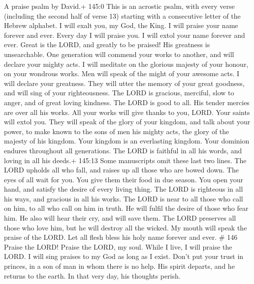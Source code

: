 A praise psalm by David.+ 145:0 This is an acrostic psalm, with every
verse (including the second half of verse 13) starting with a
consecutive letter of the Hebrew alphabet.  I will exalt
you, my God, the King. I will praise your name forever and ever.
 Every day I will praise you. I will extol your name forever
and ever.  Great is the LORD, and greatly to be praised! His
greatness is unsearchable.  One generation will commend your
works to another, and will declare your mighty acts.  I will
meditate on the glorious majesty of your honour, on your wondrous works.
 Men will speak of the might of your awesome acts. I will
declare your greatness.  They will utter the memory of your
great goodness, and will sing of your righteousness.  The
LORD is gracious, merciful, slow to anger, and of great loving kindness.
 The LORD is good to all. His tender mercies are over all
his works.  All your works will give thanks to you, LORD.
Your saints will extol you.  They will speak of the glory
of your kingdom, and talk about your power,  to make known
to the sons of men his mighty acts, the glory of the majesty of his
kingdom.  Your kingdom is an everlasting kingdom. Your
dominion endures throughout all generations. The LORD is faithful in all
his words, and loving in all his deeds.+ 145:13 Some manuscripts omit
these last two lines.  The LORD upholds all who fall, and
raises up all those who are bowed down.  The eyes of all
wait for you. You give them their food in due season.  You
open your hand, and satisfy the desire of every living thing.
 The LORD is righteous in all his ways, and gracious in all
his works.  The LORD is near to all those who call on him,
to all who call on him in truth.  He will fulfil the desire
of those who fear him. He also will hear their cry, and will save them.
 The LORD preserves all those who love him, but he will
destroy all the wicked.  My mouth will speak the praise of
the LORD. Let all flesh bless his holy name forever and ever. \# 146
 Praise the LORD! Praise the LORD, my soul. 
While I live, I will praise the LORD. I will sing praises to my God as
long as I exist.  Don't put your trust in princes, in a son
of man in whom there is no help.  His spirit departs, and he
returns to the earth. In that very day, his thoughts perish.
